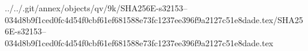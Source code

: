 ../../.git/annex/objects/qv/9k/SHA256E-s32153--034d8b9f1ced0fc4d54f0cbf61ef681588e73fc1237ee396f9a2127c51e8dade.tex/SHA256E-s32153--034d8b9f1ced0fc4d54f0cbf61ef681588e73fc1237ee396f9a2127c51e8dade.tex